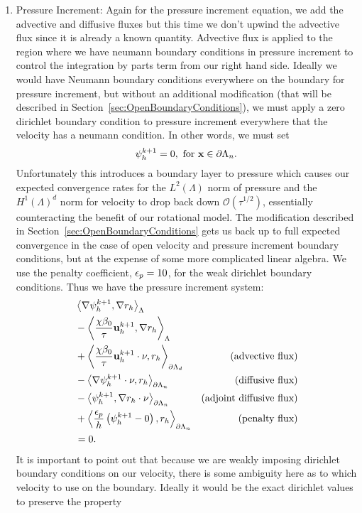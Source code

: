 \documentclass[letterpaper]{erdc}
\begin{document}
\begin{enumerate}
\item  Pressure Increment:  Again for the pressure increment equation, we add the advective and diffusive fluxes but this time we don't upwind the advective flux since it is already a known quantity.  Advective flux is applied to the region where we have neumann boundary conditions in pressure increment to control the integration by parts term from our right hand side.  Ideally we would have Neumann boundary conditions everywhere on the boundary for pressure increment, but without an additional modification (that will be described in Section~\ref{sec:OpenBoundaryConditions}), we must apply a zero dirichlet boundary condition to pressure increment everywhere that the velocity has a neumann condition.  In other words, we must set
\begin{equation}
  \psi^{k+1}_h = 0, \mbox{ for }\textbf{x}\in\partial\Lambda_n.
\end{equation}
Unfortunately this introduces a boundary layer to pressure which causes our expected convergence rates for the $L^2(\Lambda)$ norm of pressure and the $H^1(\Lambda)^d$ norm for velocity to drop back down $\mathcal{O}(\tau^{1/2})$, essentially counteracting the benefit of our rotational model.  The modification described in Section~\ref{sec:OpenBoundaryConditions} gets us back up to full expected convergence in the case of open velocity and pressure increment boundary conditions, but at the expense of some more complicated linear algebra.  We use the penalty coefficient, $\epsilon_p = 10$, for the weak dirichlet boundary conditions.  Thus we have the pressure increment system:
\begin{align*}
  &\left\langle  \nabla \psi^{k+1}_h,  \nabla r_h  \right\rangle_{\Lambda}&\\
  & - \left\langle  \frac{\chi\beta_0}{\tau} \textbf{u}^{k+1}_h,  \nabla r_h  \right\rangle_{\Lambda} &\\
  &+ \left\langle  \frac{\chi\beta_0}{\tau} \textbf{u}^{k+1}_h\cdot\nu,  r_h  \right\rangle_{\partial\Lambda_d}   &\mbox{(advective flux)}\\
  &- \left\langle  \nabla \psi^{k+1}_h\cdot\nu,  r_h  \right\rangle_{\partial\Lambda_n}      &\mbox{(diffusive flux)}\\
  &- \left\langle  \psi^{k+1}_h,  \nabla r_h\cdot\nu  \right\rangle_{\partial\Lambda_n}      &\mbox{(adjoint diffusive flux)}\\
  &+ \left\langle  \frac{\epsilon_{p}}{h} \left(\psi^{k+1}_h - 0\right),  r_h  \right\rangle_{\partial\Lambda_n}        &\mbox{(penalty flux)}\\
  & = 0. &
\end{align*}
It is important to point out that because we are weakly imposing dirichlet boundary conditions on our velocity, there is some ambiguity here as to which velocity to use on the boundary.  Ideally it would be the exact dirichlet values to preserve the property

\end{enumerate}
\end{document}
